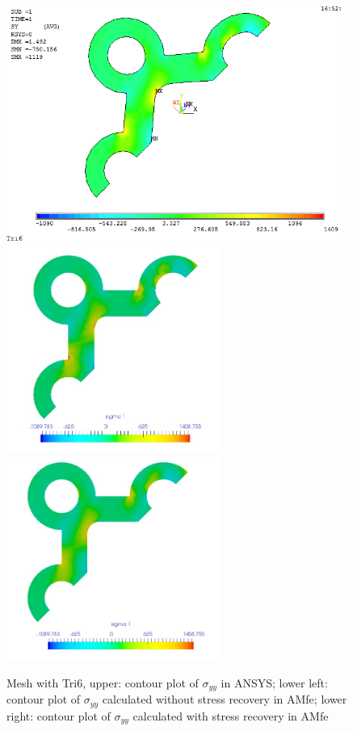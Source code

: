 \begin{figure}[htbp]
	\begin{center}
		\includegraphics[width=11cm,clip]{Tri6_Syy.png} 	
		\includegraphics[width=7cm,clip]{Tri6_Syy_PD.png} 		
		\includegraphics[width=7cm,clip]{Tri6_Syy_P.png} 		
		\caption{Mesh with Tri6, upper: contour plot of $\sigma_{yy}$ in ANSYS; lower left: contour plot of $\sigma_{yy}$ calculated without stress recovery in AMfe; lower right: contour plot of $\sigma_{yy}$ calculated with stress recovery in AMfe} \label{fig: Tri6_Syy}
	\end{center}
\end{figure}
\clearpage 

